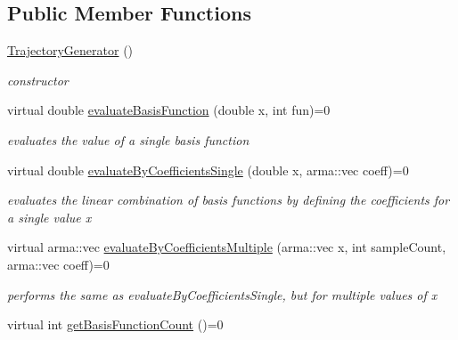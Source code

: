 \subsection*{Public Member Functions}
\begin{DoxyCompactItemize}
\item 
\hypertarget{classkukadu_1_1TrajectoryGenerator_ab8e8192c73d62ba4d5d22151f3c3b1a2}{\hyperlink{classkukadu_1_1TrajectoryGenerator_ab8e8192c73d62ba4d5d22151f3c3b1a2}{Trajectory\-Generator} ()}\label{classkukadu_1_1TrajectoryGenerator_ab8e8192c73d62ba4d5d22151f3c3b1a2}

\begin{DoxyCompactList}\small\item\em constructor \end{DoxyCompactList}\item 
virtual double \hyperlink{classkukadu_1_1TrajectoryGenerator_abbd50214ceb85171e7103a1fded7fd91}{evaluate\-Basis\-Function} (double x, int fun)=0
\begin{DoxyCompactList}\small\item\em evaluates the value of a single basis function \end{DoxyCompactList}\item 
virtual double \hyperlink{classkukadu_1_1TrajectoryGenerator_a3cd7129235c868a1cad3d56f3a05ad49}{evaluate\-By\-Coefficients\-Single} (double x, arma\-::vec coeff)=0
\begin{DoxyCompactList}\small\item\em evaluates the linear combination of basis functions by defining the coefficients for a single value x \end{DoxyCompactList}\item 
virtual arma\-::vec \hyperlink{classkukadu_1_1TrajectoryGenerator_a80e470d557ac5fc9a075b582d97bf67b}{evaluate\-By\-Coefficients\-Multiple} (arma\-::vec x, int sample\-Count, arma\-::vec coeff)=0
\begin{DoxyCompactList}\small\item\em performs the same as evaluate\-By\-Coefficients\-Single, but for multiple values of x \end{DoxyCompactList}\item 
\hypertarget{classkukadu_1_1TrajectoryGenerator_a8204375540872676478a83e2b24da772}{virtual int \hyperlink{classkukadu_1_1TrajectoryGenerator_a8204375540872676478a83e2b24da772}{get\-Basis\-Function\-Count} ()=0}\label{classkukadu_1_1TrajectoryGenerator_a8204375540872676478a83e2b24da772}


\end{DoxyCompactItemize}
